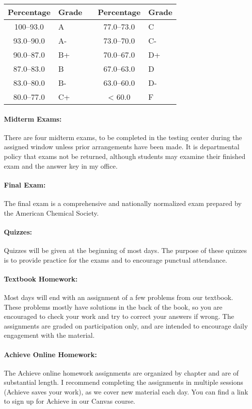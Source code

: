 \documentclass[12pt, letterpaper]{article}
\begin{document}
\begin{tabular}{cl|c|cl}
	Percentage & Grade &  & Percentage & Grade \\ \midrule
	100--93.0  & A     &  & 77.0--73.0 & C     \\
	93.0--90.0 & A-    &  & 73.0--70.0 & C-    \\
	90.0--87.0 & B+    &  & 70.0--67.0 & D+    \\
	87.0--83.0 & B     &  & 67.0--63.0 & D     \\
	83.0--80.0 & B-    &  & 63.0--60.0 & D-    \\
	80.0--77.0 & C+    &  & < 60.0     & F
\end{tabular}
\paragraph{Midterm Exams:}
There are four midterm exams, to be completed in the testing center during the assigned window unless prior arrangements have been made. It is departmental policy that exams not be returned, although students may examine their finished exam and the answer key in my office.

\paragraph{Final Exam:}
The final exam is a comprehensive and nationally normalized exam prepared by the American Chemical Society.

\paragraph{Quizzes:}
Quizzes will be given at the beginning of most days. The purpose of these quizzes is to provide practice for the exams and to encourage punctual attendance.

\paragraph{Textbook Homework:}
Most days will end with an assignment of a few problems from our textbook. These problems mostly have solutions in the back of the book, so you are encouraged to check your work and try to correct your answers if wrong. The assignments are graded on participation only, and are intended to encourage daily engagement with the material.

\paragraph{Achieve Online Homework:}
The Achieve online homework assignments are organized by chapter and are of substantial length. I recommend completing the assignments in multiple sessions (Achieve saves your work), as we cover new material each day. You can find a link to sign up for Achieve in our Canvas course.
\end{document}
